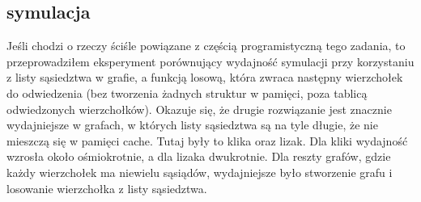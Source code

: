 \documentclass{article}
\begin{document}
\subsection*{symulacja}
Jeśli chodzi o rzeczy ściśle powiązane z częścią programistyczną tego zadania, to
przeprowadziłem eksperyment porównujący wydajność symulacji przy korzystaniu z listy
sąsiedztwa w grafie, a funkcją losową, która zwraca następny wierzchołek do odwiedzenia
(bez tworzenia żadnych struktur w pamięci, poza tablicą odwiedzonych wierzchołków).
Okazuje się, że drugie rozwiązanie jest znacznie wydajniejsze w grafach, w których
listy sąsiedztwa są na tyle długie, że nie mieszczą się w pamięci cache. Tutaj były
to klika oraz lizak. Dla kliki wydajność wzrosła około ośmiokrotnie, a dla lizaka
dwukrotnie. Dla reszty grafów, gdzie każdy wierzchołek ma niewielu sąsiądów,
wydajniejsze było stworzenie grafu i losowanie wierzchołka z listy sąsiedztwa.
\end{document}
